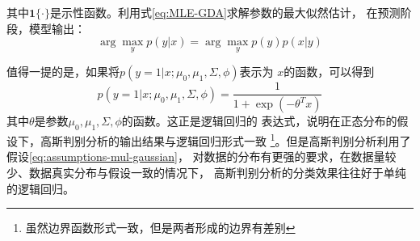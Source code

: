 其中$\mathbf{1}\{\cdot\}$是示性函数。利用式\ref{eq:MLE-GDA}求解参数的最大似然估计，
在预测阶段，模型输出：
\begin{equation*}
    \arg \max_{y} p(y|x) = \arg \max_{y} p(y)p(x|y)
\end{equation*}
\par 值得一提的是，如果将$p(y=1|x; \mu_0, \mu_1, \Sigma, \phi)$表示为
$x$的函数，可以得到
\begin{equation*}
p(y=1|x; \mu_0, \mu_1, \Sigma, \phi)=\frac{1}{1+\exp (-\theta^T x)}
\end{equation*}
其中$\theta$是参数$\mu_0, \mu_1, \Sigma, \phi$的函数。这正是逻辑回归的
表达式，说明在正态分布的假设下，高斯判别分析的输出结果与逻辑回归形式一致
\footnote{
    虽然边界函数形式一致，但是两者形成的边界有差别
}。但是高斯判别分析利用了假设\ref{eq:assumptions-mul-gaussian}，
对数据的分布有更强的要求，在数据量较少、数据真实分布与假设一致的情况下，
高斯判别分析的分类效果往往好于单纯的逻辑回归。

